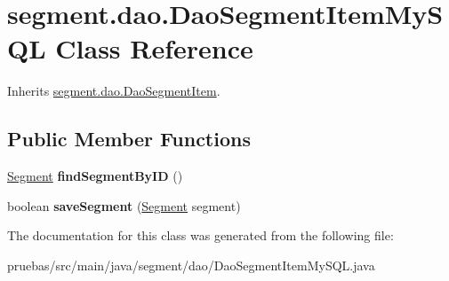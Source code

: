 \hypertarget{classsegment_1_1dao_1_1_dao_segment_item_my_s_q_l}{}\section{segment.\+dao.\+Dao\+Segment\+Item\+My\+S\+QL Class Reference}
\label{classsegment_1_1dao_1_1_dao_segment_item_my_s_q_l}


Inherits \mbox{\hyperlink{interfacesegment_1_1dao_1_1_dao_segment_item}{segment.\+dao.\+Dao\+Segment\+Item}}.

\subsection*{Public Member Functions}
\begin{DoxyCompactItemize}
\item 
\mbox{\label{classsegment_1_1dao_1_1_dao_segment_item_my_s_q_l_aa448b5ac94351b927a9b8b4da988d55a}} 
\mbox{\hyperlink{classclases_1_1_segment}{Segment}} {\bfseries find\+Segment\+By\+ID} ()
\item 
\mbox{\label{classsegment_1_1dao_1_1_dao_segment_item_my_s_q_l_a094dab67038c9f56c9bafc9a596109dc}} 
boolean {\bfseries save\+Segment} (\mbox{\hyperlink{classclases_1_1_segment}{Segment}} segment)
\end{DoxyCompactItemize}


The documentation for this class was generated from the following file\+:\begin{DoxyCompactItemize}
\item 
pruebas/src/main/java/segment/dao/Dao\+Segment\+Item\+My\+S\+Q\+L.\+java\end{DoxyCompactItemize}
